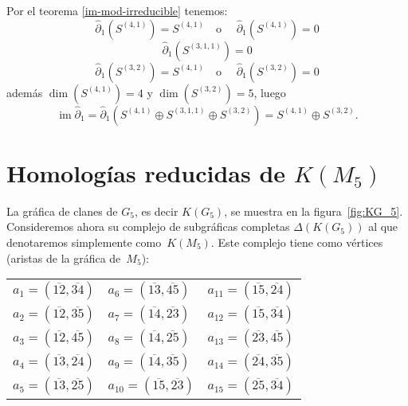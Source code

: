 \documentclass[12pt]{book}
\theoremstyle{definition}
\DeclareMathOperator{\im}{im}
\newcounter{in}
\begin{document}
Por el teorema \ref{im-mod-irreducible} tenemos:
  $$\widehat\partial_{1}(S^{(4,1)})=S^{(4,1)} \quad \mbox{o }\quad \widehat\partial_{1}(S^{(4,1)})=0$$
  $$\widehat\partial_{1}(S^{(3,1,1)})=0$$
  $$\widehat\partial_{1}(S^{(3,2)})=S^{(4,1)} \quad \mbox{o }\quad \widehat\partial_{1}(S^{(3,2)})=0$$
además $\dim(S^{(4,1)})=4$ y $\dim(S^{(3,2)})=5$, luego
$$\im\widehat\partial_{1}=\widehat\partial_{1}(S^{(4,1)}\oplus S^{(3,1,1)}\oplus S^{(3,2)})=S^{(4,1)}\oplus S^{(3,2)}.$$

\section{Homologías reducidas de $K(M_{5})$}
\label{hom-red-KM5}

La gráfica de clanes de $G_{5}$, es decir $K(G_{5})$, se muestra en la figura~\ref{fig:KG_5}.
Consideremos ahora su complejo de subgráficas completas $\Delta(K(G_{5}))$
al que denotaremos simplemente como~$K(M_{5})$. Este complejo tiene como
vértices (aristas de la gráfica de~$M_{5}$):
\begin{center}
  \begin{tabular}[h]{lll}
    $a_{1}=(\overline{12},\overline{34})$ & $a_{6}=(\overline{13},\overline{45})$ & $a_{11}=(\overline{15},\overline{24})$  \\
    $a_{2}=(\overline{12},\overline{35})$ & $a_{7}=(\overline{14},\overline{23})$ & $a_{12}=(\overline{15},\overline{34})$  \\
    $a_{3}=(\overline{12},\overline{45})$ & $a_{8}=(\overline{14},\overline{25})$ & $a_{13}=(\overline{23},\overline{45})$  \\
    $a_{4}=(\overline{13},\overline{24})$ & $a_{9}=(\overline{14},\overline{35})$ & $a_{14}=(\overline{24},\overline{35})$  \\
    $a_{5}=(\overline{13},\overline{25})$ & $a_{10}=(\overline{15},\overline{23})$ & $a_{15}=(\overline{25},\overline{34})$  
  \end{tabular}
\end{center}
\end{document}
